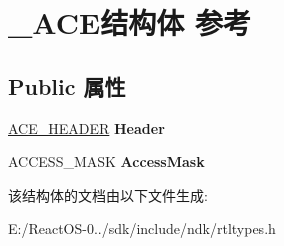 \hypertarget{struct___a_c_e}{}\section{\+\_\+\+A\+C\+E结构体 参考}
\label{struct___a_c_e}
\subsection*{Public 属性}
\begin{DoxyCompactItemize}
\item 
\mbox{\label{struct___a_c_e_a3b4593146e32a93334bead6e9331a8f2}} 
\hyperlink{struct___a_c_e___h_e_a_d_e_r}{A\+C\+E\+\_\+\+H\+E\+A\+D\+ER} {\bfseries Header}
\item 
\mbox{\label{struct___a_c_e_ab29a49ce9b6aeb6bb3c48e5352510eaa}} 
A\+C\+C\+E\+S\+S\+\_\+\+M\+A\+SK {\bfseries Access\+Mask}
\end{DoxyCompactItemize}


该结构体的文档由以下文件生成\+:\begin{DoxyCompactItemize}
\item 
E\+:/\+React\+O\+S-\/0../sdk/include/ndk/rtltypes.\+h\end{DoxyCompactItemize}
